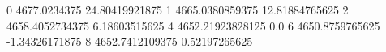 0 4677.0234375 24.80419921875
1 4665.0380859375 12.81884765625
2 4658.4052734375 6.18603515625
4 4652.21923828125 0.0
6 4650.8759765625 -1.34326171875
8 4652.7412109375 0.52197265625
